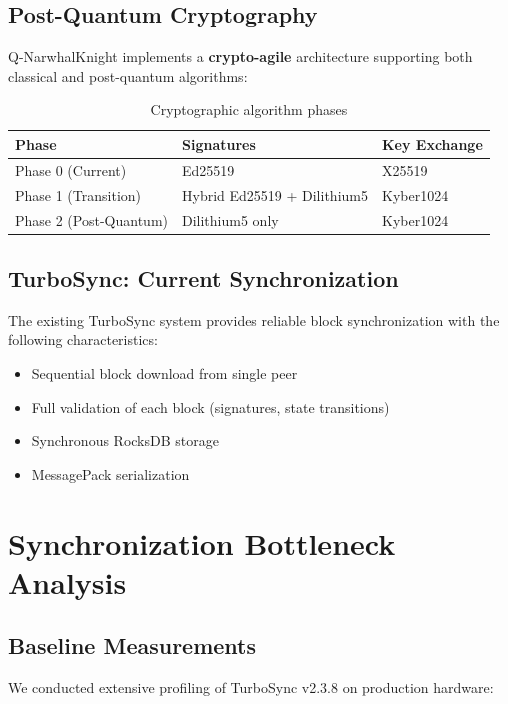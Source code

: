 \documentclass[11pt,a4paper]{article}
\begin{document}
\subsection{Post-Quantum Cryptography}

Q-NarwhalKnight implements a \textbf{crypto-agile} architecture supporting both classical and post-quantum algorithms:

\begin{table}[h]
\centering
\begin{tabular}{lll}
\toprule
\textbf{Phase} & \textbf{Signatures} & \textbf{Key Exchange} \\
\midrule
Phase 0 (Current) & Ed25519 & X25519 \\
Phase 1 (Transition) & Hybrid Ed25519 + Dilithium5 & Kyber1024 \\
Phase 2 (Post-Quantum) & Dilithium5 only & Kyber1024 \\
\bottomrule
\end{tabular}
\caption{Cryptographic algorithm phases}
\end{table}

\subsection{TurboSync: Current Synchronization}

The existing TurboSync system provides reliable block synchronization with the following characteristics:

\begin{itemize}
    \item Sequential block download from single peer
    \item Full validation of each block (signatures, state transitions)
    \item Synchronous RocksDB storage
    \item MessagePack serialization
\end{itemize}

\section{Synchronization Bottleneck Analysis}

\subsection{Baseline Measurements}

We conducted extensive profiling of TurboSync v2.3.8 on production hardware:
\end{document}
